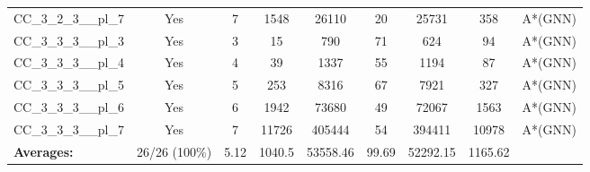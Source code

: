 \documentclass{article}
\begin{document}
\begin{tabular}{lcccccccc}
CC\_3\_2\_3\_\_pl\_7 & Yes & 7 & 1548 & 26110 & 20 & 25731 & 358 & A*(GNN) \\
CC\_3\_3\_3\_\_pl\_3 & Yes & 3 & 15 & 790 & 71 & 624 & 94 & A*(GNN) \\
CC\_3\_3\_3\_\_pl\_4 & Yes & 4 & 39 & 1337 & 55 & 1194 & 87 & A*(GNN) \\
CC\_3\_3\_3\_\_pl\_5 & Yes & 5 & 253 & 8316 & 67 & 7921 & 327 & A*(GNN) \\
CC\_3\_3\_3\_\_pl\_6 & Yes & 6 & 1942 & 73680 & 49 & 72067 & 1563 & A*(GNN) \\
CC\_3\_3\_3\_\_pl\_7 & Yes & 7 & 11726 & 405444 & 54 & 394411 & 10978 & A*(GNN) \\
\textbf{Averages:} & 26/26 (100\%) & 5.12 & 1040.5 & 53558.46 & 99.69 & 52292.15 & 1165.62 & \\
\bottomrule
\end{tabular}
\\[0.7cm]
\end{document}
